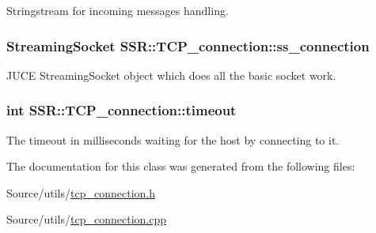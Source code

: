 Stringstream for incoming messages handling. \hypertarget{classSSR_1_1TCP__connection_a3d22ed1c827d76a52914d4a76eae1b7f}{
\subsubsection[{ss\-\_\-connection}]{\setlength{\rightskip}{0pt plus 5cm}Streaming\-Socket S\-S\-R\-::\-T\-C\-P\-\_\-connection\-::ss\-\_\-connection\hspace{0.3cm}{\ttfamily [private]}}}\label{classSSR_1_1TCP__connection_a3d22ed1c827d76a52914d4a76eae1b7f}
J\-U\-C\-E Streaming\-Socket object which does all the basic socket work. \hypertarget{classSSR_1_1TCP__connection_ab190449951139b0705e2c7cd70de1903}{
\subsubsection[{timeout}]{\setlength{\rightskip}{0pt plus 5cm}int S\-S\-R\-::\-T\-C\-P\-\_\-connection\-::timeout\hspace{0.3cm}{\ttfamily [private]}}}\label{classSSR_1_1TCP__connection_ab190449951139b0705e2c7cd70de1903}
The timeout in milliseconds waiting for the host by connecting to it. 

The documentation for this class was generated from the following files\-:\begin{DoxyCompactItemize}
\item 
Source/utils/\hyperlink{tcp__connection_8h}{tcp\-\_\-connection.\-h}\item 
Source/utils/\hyperlink{tcp__connection_8cpp}{tcp\-\_\-connection.\-cpp}\end{DoxyCompactItemize}
